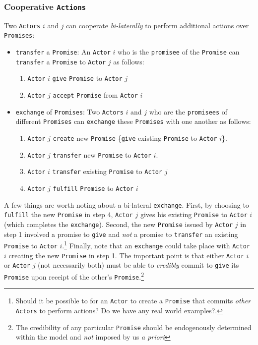 \documentclass[a4paper]{article}
\begin{document}
\subsubsection{Cooperative \texttt{Actions}}
Two \texttt{Actors} $i$ and $j$ can cooperate \textit{bi-laterally} to perform additional actions over \texttt{Promises}:
\begin{itemize}
	\item \texttt{transfer} a \texttt{Promise}: An \texttt{Actor} $i$ who is the \texttt{promisee} of the \texttt{Promise} can \texttt{transfer} a \texttt{Promise} to \texttt{Actor} $j$ as follows:
	\begin{enumerate}
		\item \texttt{Actor} $i$ \texttt{give} \texttt{Promise} to \texttt{Actor} $j$
		\item \texttt{Actor} $j$ \texttt{accept} \texttt{Promise} from \texttt{Actor} $i$
	\end{enumerate}
	\item \texttt{exchange} of \texttt{Promises}: Two \texttt{Actors} $i$ and $j$ who are the \texttt{promisees} of different \texttt{Promises} can \texttt{exchange} these \texttt{Promises} with one another as follows:
	\begin{enumerate}
		\item \texttt{Actor} $j$ \texttt{create} new \texttt{Promise} \{\texttt{give} existing \texttt{Promise} to \texttt{Actor} $i$\}.
		\item \texttt{Actor} $j$ \texttt{transfer} new \texttt{Promise} to \texttt{Actor} $i$.
		\item \texttt{Actor} $i$ \texttt{transfer} existing \texttt{Promise} to \texttt{Actor} $j$
		\item \texttt{Actor} $j$ \texttt{fulfill} \texttt{Promise} to \texttt{Actor} $i$
	\end{enumerate}
\end{itemize}
A few things are worth noting about a bi-lateral \texttt{exchange}. First, by choosing to \texttt{fulfill} the new \texttt{Promise} in step 4, \texttt{Actor} $j$ gives his existing \texttt{Promise} to \texttt{Actor} $i$ (which completes the \texttt{exchange}). Second, the new \texttt{Promise} issued by \texttt{Actor} $j$ in step 1 involved a promise to \texttt{give} and \textit{not} a promise to \texttt{transfer} an existing  \texttt{Promise} to \texttt{Actor} $i$.\footnote{
%
Should it be possible to for an \texttt{Actor} to create a \texttt{Promise} that commits \textit{other} \texttt{Actors} to perform actions? Do we have any real world examples?.
%
}
Finally, note that an \texttt{exchange} could take place with \texttt{Actor} $i$ creating the new \texttt{Promise} in step 1. The important point is that either \texttt{Actor} $i$ or \texttt{Actor} $j$ (not necessarily both) must be able to \textit{credibly} commit to \texttt{give} its \texttt{Promise} upon receipt of the other's \texttt{Promise}.\footnote{
%
The credibility of any particular \texttt{Promise} should be endogenously determined within the model and \textit{not} imposed by us \textit{a priori}
%
}
\end{document}
